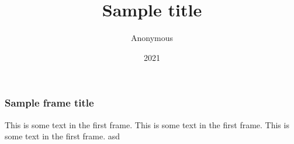 \documentclass{beamer}
\title{Sample title}
\author{Anonymous}
\institute{Overleaf}
\date{2021}
\begin{document}
\frame{\titlepage}

\begin{frame}
    \frametitle{Sample frame title}
    This is some text in the first frame. This is some text in the first frame. This is some text in the first frame. asd
\end{frame}
\end{document}

